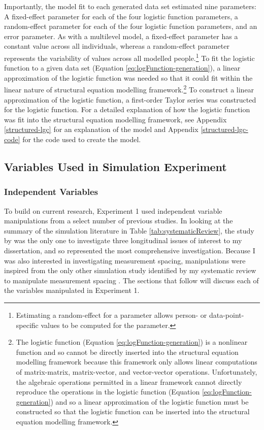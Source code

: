 \documentclass[
12pt, %
twoside,
english]{guelphthesis}
\begin{document}
\noindent Importantly, the model fit to each generated data set estimated nine parameters: A fixed-effect parameter for each of the four logistic function parameters, a random-effect parameter for each of the four logistic function parameters, and an error parameter. As with a multilevel model, a fixed-effect parameter has a constant value across all individuals, whereas a random-effect parameter represents the variability of values across all modelled people.\footnote{Estimating a random-effect for a parameter allows person- or data-point-specific values to be computed for the parameter.} To fit the logistic function to a given data set (Equation \ref{eq:logFunction-generation}), a linear approximation of the logistic function was needed so that it could fit within the linear nature of structural equation modelling framework.\footnote{The logistic function (Equation \ref{eq:logFunction-generation}) is a nonlinear function and so cannot be directly inserted into the structural equation modelling framework because this framework only allows linear computations of matrix-matrix, matrix-vector, and vector-vector operations. Unfortunately, the algebraic operations permitted in a linear framework cannot directly reproduce the operations in the logistic function (Equation \ref{eq:logFunction-generation}) and so a linear approximation of the logistic function must be constructed so that the logistic function can be inserted into the structural equation modelling framework.} To construct a linear approximation of the logistic function, a first-order Taylor series was constructed for the logistic function. For a detailed explanation of how the logistic function was fit into the structural equation modelling framework, see Appendix \ref{structured-lgc} for an explanation of the model and Appendix \ref{structured-lgc-code} for the code used to create the model.

\hypertarget{variables-used-in-simulation-experiment}{%
\subsection{Variables Used in Simulation Experiment}\label{variables-used-in-simulation-experiment}}

\hypertarget{independent-variables}{%
\subsubsection{Independent Variables}\label{independent-variables}}

To build on current research, Experiment 1 used independent variable manipulations from a select number of previous studies. In looking at the summary of the simulation literature in Table \ref{tab:systematicReview}, the study by \textcite{coulombe2016} was the only one to investigate three longitudinal issues of interest to my dissertation, and so represented the most comprehensive investigation. Because I was also interested in investigating measurement spacing, manipulations were inspired from the only other simulation study identified by my systematic review to manipulate measurement spacing \autocite[the study by][]{timmons2015}. The sections that follow will discuss each of the variables manipulated in Experiment 1.
\end{document}
